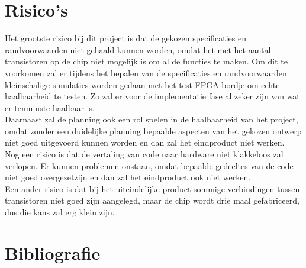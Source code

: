 \documentclass{scrartcl}
\begin{document}
\section{Risico's}
Het grootste risico bij dit project is dat de gekozen specificaties en randvoorwaarden niet gehaald kunnen worden, omdat het met het aantal transistoren op de chip niet mogelijk is om al de functies te maken. Om dit te voorkomen zal er tijdens het bepalen van de specificaties en randvoorwaarden kleinschalige simulaties worden gedaan met het test FPGA-bordje om echte haalbaarheid te testen. Zo zal er voor de implementatie fase al zeker zijn van wat er tenminste haalbaar is.
\\Daarnaast zal de planning ook een rol spelen in de haalbaarheid van het project, omdat zonder een duidelijke planning bepaalde aspecten van het gekozen ontwerp niet goed uitgevoerd kunnen worden en dan zal het eindproduct niet werken.
\\Nog een risico is dat de vertaling van code naar hardware niet klakkeloos zal verlopen. Er kunnen problemen onstaan, omdat bepaalde gedeeltes van de code niet goed overgezetzijn en dan zal het eindproduct ook niet werken.
\\Een ander risico is dat bij het uiteindelijke product sommige verbindingen tussen transistoren niet goed zijn aangelegd, maar de chip wordt drie maal gefabriceerd, dus die kans zal erg klein zijn.

\newpage
\section{Bibliografie}
\printbibliography
\end{document}
